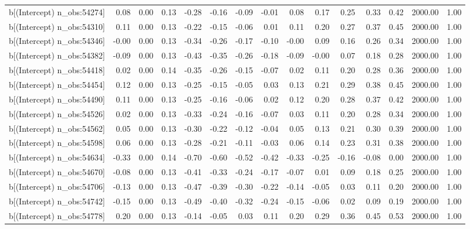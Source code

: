 \begin{table}[ht]
\begin{tabular}{rrrrrrrrrrrrrrr}
  b[(Intercept) n\_obs:54274] & 0.08 & 0.00 & 0.13 & -0.28 & -0.16 & -0.09 & -0.01 & 0.08 & 0.17 & 0.25 & 0.33 & 0.42 & 2000.00 & 1.00 \\ 
  b[(Intercept) n\_obs:54310] & 0.11 & 0.00 & 0.13 & -0.22 & -0.15 & -0.06 & 0.01 & 0.11 & 0.20 & 0.27 & 0.37 & 0.45 & 2000.00 & 1.00 \\ 
  b[(Intercept) n\_obs:54346] & -0.00 & 0.00 & 0.13 & -0.34 & -0.26 & -0.17 & -0.10 & -0.00 & 0.09 & 0.16 & 0.26 & 0.34 & 2000.00 & 1.00 \\ 
  b[(Intercept) n\_obs:54382] & -0.09 & 0.00 & 0.13 & -0.43 & -0.35 & -0.26 & -0.18 & -0.09 & -0.00 & 0.07 & 0.18 & 0.28 & 2000.00 & 1.00 \\ 
  b[(Intercept) n\_obs:54418] & 0.02 & 0.00 & 0.14 & -0.35 & -0.26 & -0.15 & -0.07 & 0.02 & 0.11 & 0.20 & 0.28 & 0.36 & 2000.00 & 1.00 \\ 
  b[(Intercept) n\_obs:54454] & 0.12 & 0.00 & 0.13 & -0.25 & -0.15 & -0.05 & 0.03 & 0.13 & 0.21 & 0.29 & 0.38 & 0.45 & 2000.00 & 1.00 \\ 
  b[(Intercept) n\_obs:54490] & 0.11 & 0.00 & 0.13 & -0.25 & -0.16 & -0.06 & 0.02 & 0.12 & 0.20 & 0.28 & 0.37 & 0.42 & 2000.00 & 1.00 \\ 
  b[(Intercept) n\_obs:54526] & 0.02 & 0.00 & 0.13 & -0.33 & -0.24 & -0.16 & -0.07 & 0.03 & 0.11 & 0.20 & 0.28 & 0.34 & 2000.00 & 1.00 \\ 
  b[(Intercept) n\_obs:54562] & 0.05 & 0.00 & 0.13 & -0.30 & -0.22 & -0.12 & -0.04 & 0.05 & 0.13 & 0.21 & 0.30 & 0.39 & 2000.00 & 1.00 \\ 
  b[(Intercept) n\_obs:54598] & 0.06 & 0.00 & 0.13 & -0.28 & -0.21 & -0.11 & -0.03 & 0.06 & 0.14 & 0.23 & 0.31 & 0.38 & 2000.00 & 1.00 \\ 
  b[(Intercept) n\_obs:54634] & -0.33 & 0.00 & 0.14 & -0.70 & -0.60 & -0.52 & -0.42 & -0.33 & -0.25 & -0.16 & -0.08 & 0.00 & 2000.00 & 1.00 \\ 
  b[(Intercept) n\_obs:54670] & -0.08 & 0.00 & 0.13 & -0.41 & -0.33 & -0.24 & -0.17 & -0.07 & 0.01 & 0.09 & 0.18 & 0.25 & 2000.00 & 1.00 \\ 
  b[(Intercept) n\_obs:54706] & -0.13 & 0.00 & 0.13 & -0.47 & -0.39 & -0.30 & -0.22 & -0.14 & -0.05 & 0.03 & 0.11 & 0.20 & 2000.00 & 1.00 \\ 
  b[(Intercept) n\_obs:54742] & -0.15 & 0.00 & 0.13 & -0.49 & -0.40 & -0.32 & -0.24 & -0.15 & -0.06 & 0.02 & 0.09 & 0.19 & 2000.00 & 1.00 \\ 
  b[(Intercept) n\_obs:54778] & 0.20 & 0.00 & 0.13 & -0.14 & -0.05 & 0.03 & 0.11 & 0.20 & 0.29 & 0.36 & 0.45 & 0.53 & 2000.00 & 1.00 \\ 

\end{tabular}
\end{table}
